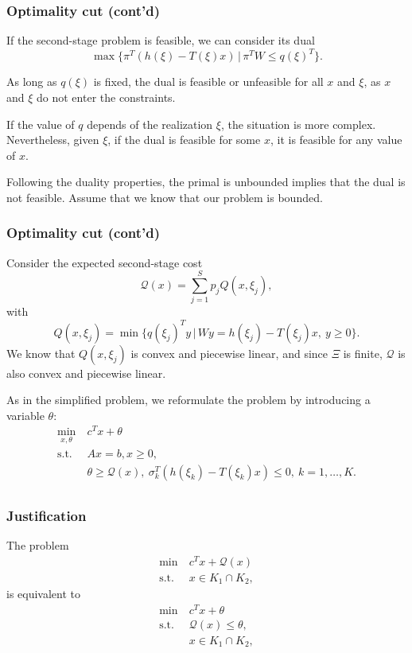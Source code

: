 \documentclass{beamer}
\begin{document}
\begin{frame}
\frametitle{Optimality cut (cont'd)}
	
If {\red the second-stage problem is feasible}, we can consider its dual
\[
\max \lbrace \pi^T(h(\xi)-T(\xi)x) \,|\, \pi^TW \leq q(\xi)^T \rbrace.
\]
	
\mbox{}

As long as $q(\xi)$ is fixed, the dual is feasible or unfeasible for all $x$ and $\xi$, as $x$ and $\xi$ do not enter the constraints.
	
\mbox{}
	
If the value of $q$ depends of the realization $\xi$, the situation is more complex.
Nevertheless, given $\xi$, if the dual is feasible for some $x$, it is feasible for any value of $x$.
	
\mbox{}

Following the duality properties, the primal is unbounded implies that the dual is not feasible.
Assume that we know that our problem is bounded.
	
\end{frame}

\begin{frame}
\frametitle{Optimality cut (cont'd)}
	
Consider the expected second-stage cost
\[
\mathcal{Q}(x) = \sum_{j=1}^S p_jQ(x,\xi_j),
\]
with
\[
Q(x,\xi_j) = \min \lbrace q(\xi_j)^Ty \,|\, Wy = h(\xi_j)-T(\xi_j)x,\
y \geq 0 \rbrace.
\]
We know that $Q(x,\xi_j)$ is convex and piecewise linear, and since $\Xi$ is finite, $\mathcal{Q}$ is also convex and piecewise linear.
	
\mbox{}
	
As in the simplified problem, we reformulate the problem by introducing a variable $\theta$:
\begin{align*}
\min_{x,\theta}\ & c^Tx+\theta\\
\mbox{s.t. } & Ax = b, x \geq 0,\\
& \theta \geq \mathcal{Q}(x),\ 
\sigma_k^T(h(\xi_k)-T(\xi_k)x) \leq 0,\ k = 1,\ldots,K.\\
\end{align*}
	
\end{frame}

\begin{frame}
\frametitle{Justification}
	
The problem
	\begin{align*}
	\min\ & c^Tx + \mathcal{Q}(x) \\
	\mbox{s.t. } & x \in K_1 \cap K_2,
	\end{align*}
is equivalent to
	\begin{align*}
	\min\ & c^Tx + \theta \\
	\mbox{s.t. } & \mathcal{Q}(x) \leq \theta, \\
	& x \in K_1 \cap K_2,
	\end{align*}
	
\end{frame}
\end{document}
